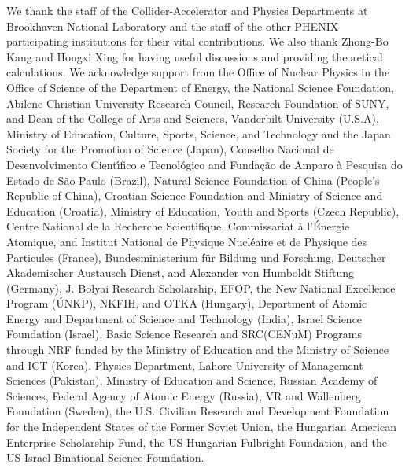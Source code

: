 \documentclass[twocolumn,letterpaper,aps,prc,longbibliography,superscriptaddress,nofootinbib,floatfix]{revtex4-2}
\begin{document}
\begin{acknowledgments}

We thank the staff of the Collider-Accelerator and Physics
Departments at Brookhaven National Laboratory and the staff of
the other PHENIX participating institutions for their vital
contributions.  
We also thank Zhong-Bo Kang and Hongxi Xing for having useful discussions and providing theoretical calculations.
We acknowledge support from the
Office of Nuclear Physics in the
Office of Science of the Department of Energy,
the National Science Foundation,
Abilene Christian University Research Council,
Research Foundation of SUNY, and
Dean of the College of Arts and Sciences, Vanderbilt University
(U.S.A),
Ministry of Education, Culture, Sports, Science, and Technology
and the Japan Society for the Promotion of Science (Japan),
Conselho Nacional de Desenvolvimento Cient\'{\i}fico e
Tecnol{\'o}gico and Funda\c c{\~a}o de Amparo {\`a} Pesquisa do
Estado de S{\~a}o Paulo (Brazil),
Natural Science Foundation of China (People's Republic of China),
Croatian Science Foundation and
Ministry of Science and Education (Croatia),
Ministry of Education, Youth and Sports (Czech Republic),
Centre National de la Recherche Scientifique, Commissariat
{\`a} l'{\'E}nergie Atomique, and Institut National de Physique
Nucl{\'e}aire et de Physique des Particules (France),
Bundesministerium f\"ur Bildung und Forschung, Deutscher Akademischer
Austausch Dienst, and Alexander von Humboldt Stiftung (Germany),
J. Bolyai Research Scholarship, EFOP, the New National Excellence
Program ({\'U}NKP), NKFIH, and OTKA (Hungary),
Department of Atomic Energy and Department of Science and Technology
(India),
Israel Science Foundation (Israel),
Basic Science Research and SRC(CENuM) Programs through NRF
funded by the Ministry of Education and the Ministry of
Science and ICT (Korea).
Physics Department, Lahore University of Management Sciences (Pakistan),
Ministry of Education and Science, Russian Academy of Sciences,
Federal Agency of Atomic Energy (Russia),
VR and Wallenberg Foundation (Sweden),
the U.S. Civilian Research and Development Foundation for the
Independent States of the Former Soviet Union,
the Hungarian American Enterprise Scholarship Fund,
the US-Hungarian Fulbright Foundation,
and the US-Israel Binational Science Foundation.

\end{acknowledgments}


   
\end{document}

